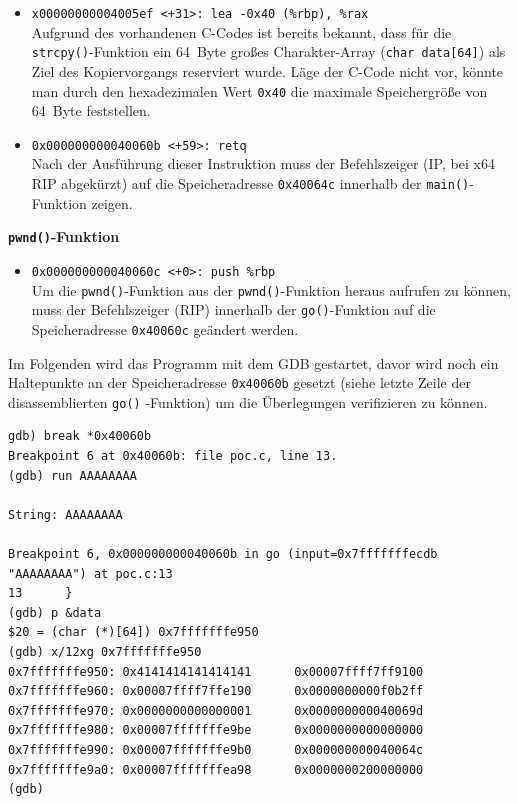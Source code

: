 \begin{itemize}
      \item \texttt{x00000000004005ef <+31>:    lea    -0x40	(\%rbp), \%rax}\\
        Aufgrund des vorhandenen C-Codes ist bereits bekannt, dass für die \texttt{strcpy()}-Funktion ein \SI{64}{Byte} großes Charakter-Array (\texttt{char data[64]}) als Ziel des Kopiervorgangs reserviert wurde. Läge der C-Code nicht vor, könnte man durch den hexadezimalen Wert \texttt{0x40} die maximale Speichergröße von \SI{64}{Byte} feststellen.        
      \item \texttt{0x000000000040060b <+59>:    retq}\\
        Nach der Ausführung dieser Instruktion muss der Befehlszeiger (IP, bei x64 RIP abgekürzt) auf die Speicheradresse \texttt{0x40064c} innerhalb der \texttt{main()}-Funktion zeigen.
\end{itemize}



\textbf{\texttt{pwnd()}-Funktion}

\begin{itemize}
      \item \texttt{0x000000000040060c <+0>:     push   \%rbp}\\
        Um die \texttt{pwnd()}-Funktion aus der \texttt{pwnd()}-Funktion heraus aufrufen zu können, muss der Befehlszeiger (RIP) innerhalb der \texttt{go()}-Funktion auf die Speicheradresse \texttt{0x40060c} geändert werden. 
\end{itemize}

Im Folgenden wird das Programm mit dem GDB gestartet, davor wird noch ein Haltepunkte an der Speicheradresse \texttt{0x40060b} gesetzt (siehe letzte Zeile der disassemblierten \texttt{go()} -Funktion) um die Überlegungen verifizieren zu können.
        
\begin{lstlisting}[basicstyle=\ttfamily\footnotesize]
gdb) break *0x40060b
Breakpoint 6 at 0x40060b: file poc.c, line 13.
(gdb) run AAAAAAAA

String: AAAAAAAA

Breakpoint 6, 0x000000000040060b in go (input=0x7fffffffecdb "AAAAAAAA") at poc.c:13
13      }
(gdb) p &data
$20 = (char (*)[64]) 0x7fffffffe950
(gdb) x/12xg 0x7fffffffe950
0x7fffffffe950: 0x4141414141414141      0x00007ffff7ff9100
0x7fffffffe960: 0x00007ffff7ffe190      0x0000000000f0b2ff
0x7fffffffe970: 0x0000000000000001      0x000000000040069d
0x7fffffffe980: 0x00007fffffffe9be      0x0000000000000000
0x7fffffffe990: 0x00007fffffffe9b0      0x000000000040064c
0x7fffffffe9a0: 0x00007fffffffea98      0x0000000200000000
(gdb)
\end{lstlisting}

